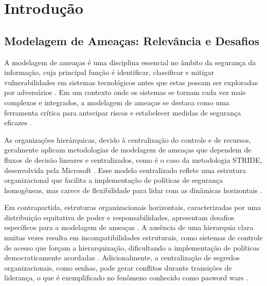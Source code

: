 
%

%

\chapter{Introdução}
\label{cha:Introduction}

\section{Modelagem de Ameaças: Relevância e Desafios}
\label{sec:modelagem_ameacas}

A modelagem de ameaças é uma disciplina essencial no âmbito da segurança da
informação, cuja principal função é identificar, classificar e mitigar
vulnerabilidades em sistemas tecnológicos antes que estas possam ser exploradas
por adversários \cite{ThreatModelingdesigningForSecurity, ThreatModelingASystematicLiteratureReview}.
Em um contexto onde os sistemas se tornam cada vez mais
complexos e integrados, a modelagem de ameaças se destaca como uma ferramenta
crítica para antecipar riscos e estabelecer medidas de segurança eficazes
\cite{DemystifyingTheThreatModelingProcess, ThreatModelingASummaryOfAvailableMethods}.

As organizações hierárquicas, devido à centralização do controle e de recursos,
geralmente aplicam metodologias de modelagem de ameaças que dependem de fluxos
de decisão lineares e centralizados, como é o caso da metodologia STRIDE,
desenvolvida pela Microsoft \cite{MicrosoftThreatModelingTechnique}.
Esse modelo centralizado reflete uma estrutura organizacional que facilita a
implementação de políticas de segurança homogêneas, mas carece de flexibilidade
para lidar com as dinâmicas horizontais
\cite{Colbac, EvaluationofCompetingThreatModeling}.

Em contrapartida, estruturas organizacionais horizontais, caracterizadas por uma
distribuição equitativa de poder e responsabilidades, apresentam desafios
específicos para a modelagem de ameaças \cite{Colbac}. A ausência de uma
hierarquia clara muitas vezes resulta em incompatibilidades estruturais, como
sistemas de controle de acesso que forçam a hierarquização, dificultando a
implementação de políticas democraticamente acordadas \cite{Colbac, ParticipatoryThreatModelling}.
Adicionalmente, a centralização de segredos organizacionais, como senhas, pode
gerar conflitos durante transições de liderança, o que é exemplificado no
fenômeno conhecido como pasword wars \cite{FromCounterpublicstoContentious, Colbac}.

